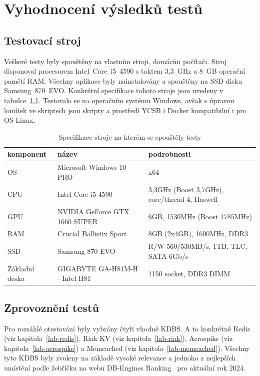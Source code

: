 \documentclass[czech,master,dept460,male,csharp,cpdeclaration]{diploma}
\begin{document}
	\chapter{Vyhodnocení výsledků testů\label{chapter:4-test_results}}
	
	\section{Testovací stroj}
	
	Veškeré testy byly spouštěny na vlastním stroji, domácím počítači. Stroj disponoval procesorem Intel~Core~i5~4590 s taktem 3,3~GHz a 8~GB operační pamětí RAM. Všechny aplikace byly nainstalovány a spouštěny na SSD disku Samsung~870~EVO. Konkrétní specifikace tohoto stroje jsou uvedeny v tabulce~\ref{tab_my_pc_spec}. Testovalo se na operačním systému Windows, avšak s úpravou lomítek ve skriptech jsou skripty a prostředí YCSB i Docker kompatibilní i pro OS Linux.
	
	\begin{table}
	\centering
	\caption{Specifikace stroje na kterém se spouštěly testy\label{tab_my_pc_spec}}
		\begin{tabular}{ l | l | l } 
			\toprule
			komponent & název & podrobnosti \\
			\midrule
			OS & Microsoft Windows 10 PRO & x64 \\
			CPU & Intel Core i5 4590 & 3,3GHz (Boost 3,7GHz), core/thread 4, Haswell\\
			GPU & NVIDIA GeForce GTX 1660 SUPER & 6GB, 1530MHz (Boost 1785MHz) \\
			RAM & Crucial Ballistix Sport & 8GB (2x4GB), 1600MHz, DDR3 \\
			SSD & Samsung 870 EVO & R/W 560/530MB/s, 1TB, TLC, SATA 6Gb/s \\
			Základní deska & GIGABYTE GA-H81M-H - Intel H81 & 1150 socket, DDR3 DIMM \\
			\bottomrule
		\end{tabular}
	\end{table}

	\section{Zprovoznění testů}
	
	Pro rozsáhlé otestování byly vybrány čtyři vhodné KDBS. A to konkrétně Redis (viz kapitola~\ref{lab-redis}), Riak KV (viz kapitola~\ref{lab-riak}), Aerospike (viz kapitola~\ref{lab-aerospike}) a Memcached (viz kapitola~\ref{lab-memcached}). Všechny tyto KDBS byly zvoleny na základě vysoké relevance a jednoho z nejlepších umístění podle žebříčku na webu DB-Engines Ranking~\cite{db-engineers-ranking} pro aktuální rok 2024.
	
\end{document}
